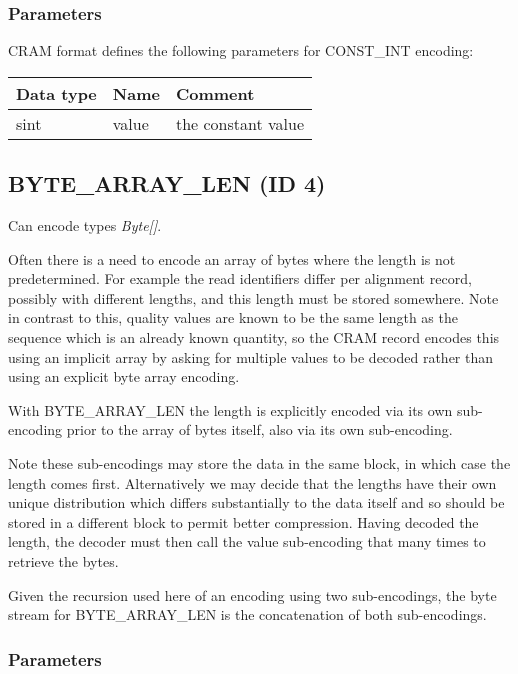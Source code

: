 \documentclass[a4paper]{article}
\begin{document}
\subsubsection*{Parameters}

CRAM format defines the following parameters for CONST\_INT encoding: 

\begin{tabular}{|>{\raggedright}p{100pt}|>{\raggedright}p{100pt}|>{\raggedright}p{230pt}|}
\hline
\textbf{Data type} & \textbf{Name} & \textbf{Comment}
\tabularnewline
\hline
sint & value & the constant value\tabularnewline
\hline
\end{tabular}

\subsection{BYTE\_ARRAY\_LEN (ID 4)}

Can encode types \textit{Byte[]}.

Often there is a need to encode an array of bytes where the length is
not predetermined.  For example the read identifiers differ per
alignment record, possibly with different lengths, and this length
must be stored somewhere.   Note in contrast to this, quality values
are known to be the same length as the sequence which is an already
known quantity, so the CRAM record encodes this using an implicit
array by asking for multiple values to be decoded rather than using an
explicit byte array encoding.

With BYTE\_ARRAY\_LEN the length is explicitly encoded via its own
sub-encoding prior to the array of bytes itself, also via its own
sub-encoding.

Note these sub-encodings may store the data in the same block, in
which case the length comes first. Alternatively we may decide that
the lengths have their own unique distribution which differs
substantially to the data itself and so should be stored in a
different block to permit better compression.  Having decoded the
length, the decoder must then call the value sub-encoding that many
times to retrieve the bytes.

Given the recursion used here of an encoding using two sub-encodings,
the byte stream for BYTE\_ARRAY\_LEN is the concatenation of both
sub-encodings.

\subsubsection*{Parameters}
\end{document}
